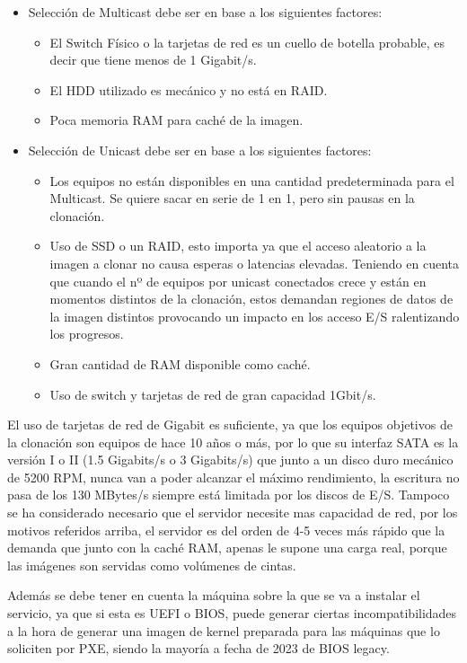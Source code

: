 \begin{itemize}
	\item Selección de Multicast debe ser en base a los siguientes factores:
	\begin{itemize}
		\item El Switch Físico o la tarjetas de red es un cuello de botella probable, es decir que tiene menos de 1 Gigabit/s.
		\item El HDD utilizado es mecánico y no está en RAID.
		\item Poca memoria RAM para caché de la imagen.
	\end{itemize}

	\item Selección de Unicast debe ser en base a los siguientes factores:

	\begin{itemize}
		\item Los equipos no están disponibles en una cantidad predeterminada para el Multicast. Se quiere sacar en serie de 1 en 1, pero sin pausas en la clonación.
		\item Uso de SSD o un RAID, esto importa ya que el acceso aleatorio a la imagen a clonar no causa esperas o latencias elevadas. Teniendo en cuenta que cuando el nº de equipos por unicast conectados crece y están en momentos distintos de la clonación, 
		estos demandan regiones de datos de la imagen distintos provocando un impacto en los acceso E/S ralentizando los progresos.
		\item Gran cantidad de RAM disponible como caché.
		\item Uso de switch y tarjetas de red de gran capacidad 1Gbit/s.
	\end{itemize}
\end{itemize}

El uso de tarjetas de red de Gigabit es suficiente, ya que los equipos objetivos de la clonación son equipos de hace 10 años o más, por lo que su interfaz 
SATA es la versión I o II (1.5 Gigabits/s o 3 Gigabits/s) que junto a un disco duro mecánico de 5200 RPM, nunca van a poder alcanzar el máximo rendimiento, 
la escritura no pasa de los 130 MBytes/s siempre está limitada por los discos de E/S. Tampoco se ha considerado necesario que el servidor necesite mas capacidad de red, 
por los motivos referidos arriba, el servidor es del orden de 4-5 veces más rápido que la demanda que junto con la caché RAM, apenas le supone una carga real, 
porque las imágenes son servidas como volúmenes de cintas.

Además se debe tener en cuenta la máquina sobre la que se va a instalar el servicio, ya que si esta es UEFI o BIOS, puede generar ciertas incompatibilidades a la hora
de generar una imagen de kernel preparada para las máquinas que lo soliciten por PXE, siendo la mayoría a fecha de 2023 de BIOS legacy.

